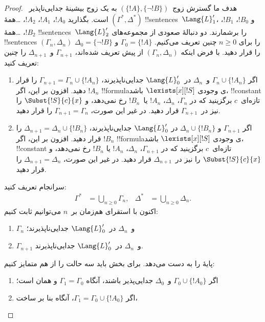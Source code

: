 \documentclass[../../../include/open-logic-section]{subfiles}
\begin{document}
\begin{proof}
هدف ما گسترش زوج~$(\{ !A \}, \{\lnot!B\})$ به یک زوج بیشینهٔ
جدایی‌ناپذیر~$(\Gamma^*, \Delta^*)$ است. بگذارید
$!A_0$، $!A_1$، $!A_2$، \dots همهٔ !!{sentence}s~$\Lang{L}'_1$، و
$!B_0$، $!B_1$، $!B_2$، \dots همهٔ !!{sentence}s~$\Lang{L}'_2$ را
برشمارند. دو دنبالهٔ صعودی از مجموعه‌های !!{sentence}s
$(\Gamma_n, \Delta_n)$ را برای $n \ge 0$ چنین تعریف می‌کنیم.
$\Gamma_0 = \{ !A\}$ و $\Delta_0 = \{\lnot !B \}$ را قرار دهید. با
فرض اینکه $(\Gamma_n, \Delta_n)$ از پیش تعریف شده‌اند،
$\Gamma_{n+1}$ و~$\Delta_{n+1}$ را چنین تعریف کنید:
\begin{enumerate}
\item اگر $\Gamma_n \cup \{!A_n \}$ و~$\Delta_n$ در~$\Lang{L}'_0$
  جدایی‌ناپذیرند، $\Gamma_{n+1}=\Gamma_n\cup\{!A_n\}$ را قرار دهید.
  افزون بر این، اگر $!A_n$ !!{formula}ی وجودی
  $\lexists[x][!S]$ باشد، !!{constant} تازه‌ای~$c$ برگزینید که در
  $\Gamma_n$، $\Delta_n$، $!A_n$ یا~$!B_n$ رخ نمی‌دهد، و
  $\Subst{!S}{c}{x}$ را نیز در~$\Gamma_{n+1}$ قرار دهید. در غیر این
  صورت، $\Gamma_{n+1}=\Gamma_n$ را قرار دهید.
\item اگر $\Gamma_{n+1}$ و $\Delta_n \cup \{!B_n \}$ در
  $\Lang{L}'_0$ جدایی‌ناپذیرند،
  $\Delta_{n+1}=\Delta_n\cup\{!B_n\}$ را قرار دهید. افزون بر این، اگر
  $!B_n$ !!{formula}ی وجودی $\lexists[x][!S]$ باشد، !!{constant}
  تازه‌ای~$c$ برگزینید که در $\Gamma_{n+1}$، $\Delta_n$، $!A_n$ یا
  $!B_n$ رخ نمی‌دهد، و $\Subst{!S}{c}{x}$ را نیز در~$\Delta_{n+1}$
  قرار دهید. در غیر این صورت، $\Delta_{n+1}=\Delta_n$ را قرار دهید.
\end{enumerate}
سرانجام تعریف کنید:
\begin{align*}
  \Gamma^* & = \bigcup_{n\ge 0} \Gamma_n, &
  \Delta^* & = \bigcup_{n\ge 0} \Delta_n.
\end{align*}
اکنون با استقرای هم‌زمان بر~$n$ می‌توانیم ثابت کنیم:
\begin{enumerate}
\item{} $\Gamma_n$ و~$\Delta_n$ در~$\Lang{L}'_0$
  جدایی‌ناپذیرند؛
\item{} $\Gamma_{n+1}$ و~$\Delta_n$ در~$\Lang{L}'_0$
    جدایی‌ناپذیرند.
\end{enumerate}
پایهٔ  را  به دست می‌دهد. برای بخش
 باید سه حالت را از هم متمایز کنیم:
\begin{enumerate}
\item اگر $\Gamma_0 \cup \{!A_0 \}$ و~$\Delta_0$ جدایی‌پذیر باشند،
  آنگاه $\Gamma_1 = \Gamma_0$ و  همان
   است؛
\item اگر $\Gamma_1 = \Gamma_0 \cup\{ !A_0\}$، آنگاه بنا بر ساخت،

\end{enumerate}
\end{proof}
\end{document}
